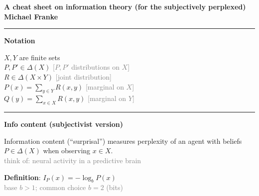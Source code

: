 \documentclass[a4paper,fleqn,reqno,12pt,landscape]{article}
\date{}
\newcommand{\mygray}[1]{\textcolor{gray}{#1}}
\newcommand{\mycomment}[1]{{\footnotesize \hfill \mygray{[#1]}}}
\newcommand{\myremark}[1]{{\footnotesize\mygray{#1}}}
\newcommand{\myrule}{\bigskip \hrule \bigskip \bigskip}
\begin{document}
\thispagestyle{empty}

\noindent \textbf{A cheat sheet on information theory (for the subjectively perplexed)} \hfill \textbf{Michael Franke}

\hrule

\bigskip


\begin{paracol}{2}


  \textbf{Notation}

  \medskip

  $X,Y$ are finite sets
  \\
  $P,P' \in \Delta(X)$ \hfill \mycomment{$P,P'$ distributions on $X$}
  \\
  $R \in \Delta(X \times Y)$ \mycomment{joint distribution}
  \\
  $P(x) = \sum_{y \in Y} R(x,y)$ \mycomment{marginal on $X$}
  \\
  $Q(y) = \sum_{x \in X} R(x,y)$ \mycomment{marginal on $Y$}

  \myrule

  \textbf{Info content (subjectivist version)}
  \medskip

  Information content (``surprisal'') measures perplexity of an agent with beliefs $P \in \Delta(X)$ when observing $x \in X$.
  \\
  \myremark{\hfill think of: neural activity in a predictive brain}

  \medskip

  \textbf{Definition}: $I_{P}(x) = - \log_{b} P(x)$
  \\
  \myremark{\hfill base $b>1$; common choice $b=2$ (bits)}

  \bigskip

\end{paracol}
\end{document}
